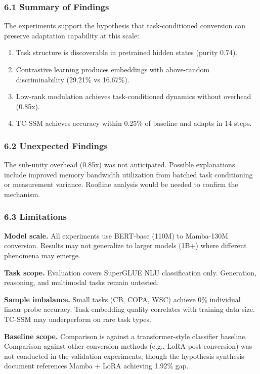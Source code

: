 
\subsubsection{6.1 Summary of Findings}

The experiments support the hypothesis that task-conditioned conversion can preserve adaptation capability at this scale:

\begin{enumerate}
\item Task structure is discoverable in pretrained hidden states (purity 0.74).
\item Contrastive learning produces embeddings with above-random discriminability (29.21\% vs 16.67\%).
\item Low-rank modulation achieves task-conditioned dynamics without overhead (0.85x).
\item TC-SSM achieves accuracy within 0.25\% of baseline and adapts in 14 steps.
\end{enumerate}

\subsubsection{6.2 Unexpected Findings}

The sub-unity overhead (0.85x) was not anticipated. Possible explanations include improved memory bandwidth utilization from batched task conditioning or measurement variance. Roofline analysis would be needed to confirm the mechanism.

\subsubsection{6.3 Limitations}

\textbf{Model scale.} All experiments use BERT-base (110M) to Mamba-130M conversion. Results may not generalize to larger models (1B+) where different phenomena may emerge.

\textbf{Task scope.} Evaluation covers SuperGLUE NLU classification only. Generation, reasoning, and multimodal tasks remain untested.

\textbf{Sample imbalance.} Small tasks (CB, COPA, WSC) achieve 0\% individual linear probe accuracy. Task embedding quality correlates with training data size. TC-SSM may underperform on rare task types.

\textbf{Baseline scope.} Comparison is against a transformer-style classifier baseline. Comparison against other conversion methods (e.g., LoRA post-conversion) was not conducted in the validation experiments, though the hypothesis synthesis document references Mamba + LoRA achieving 1.92\% gap.

